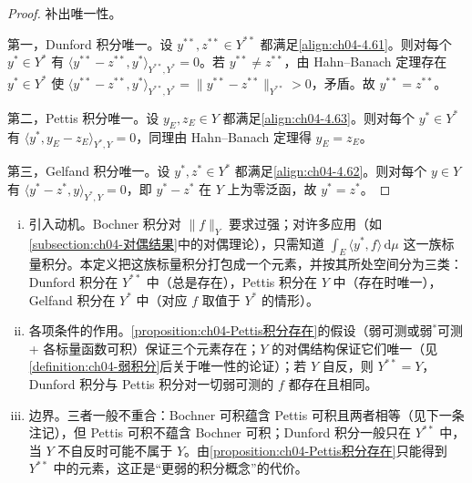 \documentclass[../../main.tex]{subfiles}%
\begin{document}
\begin{proof}
补出唯一性。

第一，Dunford 积分唯一。设 $y^{**},z^{**}\in Y^{**}$ 都满足\eqref{align:ch04-4.61}。则对每个 $y^*\in Y^*$ 有 $\langle y^{**}-z^{**},y^*\rangle_{Y^{**},Y^*}=0$。若 $y^{**}\neq z^{**}$，由 Hahn--Banach 定理存在 $y^*\in Y^*$ 使 $\langle y^{**}-z^{**},y^*\rangle_{Y^{**},Y^*}=\|y^{**}-z^{**}\|_{Y^{**}}>0$，矛盾。故 $y^{**}=z^{**}$。

第二，Pettis 积分唯一。设 $y_E,z_E\in Y$ 都满足\eqref{align:ch04-4.63}。则对每个 $y^*\in Y^*$ 有 $\langle y^*,y_E-z_E\rangle_{Y^*,Y}=0$，同理由 Hahn--Banach 定理得 $y_E=z_E$。

第三，Gelfand 积分唯一。设 $y^*,z^*\in Y^*$ 都满足\eqref{align:ch04-4.62}。则对每个 $y\in Y$ 有 $\langle y^*-z^*,y\rangle_{Y^*,Y}=0$，即 $y^*-z^*$ 在 $Y$ 上为零泛函，故 $y^*=z^*$。
\end{proof}

\begin{remark}\label{remark:ch04-弱积分动机}
\begin{enumerate}[(i)]
\item 引入动机。Bochner 积分对 $\|f\|_Y$ 要求过强；对许多应用（如\cref{subsection:ch04-对偶结果}中的对偶理论），只需知道 $\int_E\langle y^*,f\rangle\,\mathrm{d}\mu$ 这一族标量积分。本定义把这族标量积分打包成一个元素，并按其所处空间分为三类：Dunford 积分在 $Y^{**}$ 中（总是存在），Pettis 积分在 $Y$ 中（存在时唯一），Gelfand 积分在 $Y^*$ 中（对应 $f$ 取值于 $Y^*$ 的情形）。

\item 各项条件的作用。\cref{proposition:ch04-Pettis积分存在}的假设（弱可测或弱$^*$可测 + 各标量函数可积）保证三个元素存在；$Y$ 的对偶结构保证它们唯一（见\cref{definition:ch04-弱积分}后关于唯一性的论证）；若 $Y$ 自反，则 $Y^{**}=Y$，Dunford 积分与 Pettis 积分对一切弱可测的 $f$ 都存在且相同。

\item 边界。三者一般不重合：Bochner 可积蕴含 Pettis 可积且两者相等（见下一条注记），但 Pettis 可积不蕴含 Bochner 可积；Dunford 积分一般只在 $Y^{**}$ 中，当 $Y$ 不自反时可能不属于 $Y$。由\cref{proposition:ch04-Pettis积分存在}只能得到 $Y^{**}$ 中的元素，这正是“更弱的积分概念”的代价。
\end{enumerate}
\end{remark}
\end{document}
